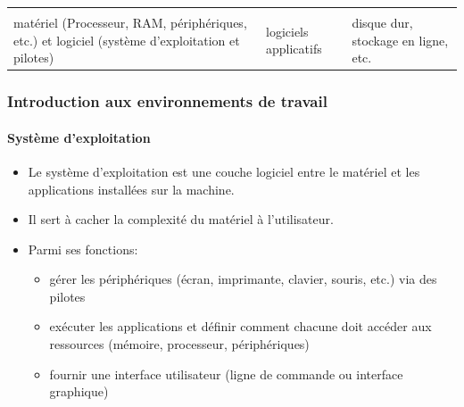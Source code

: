 \documentclass[xcolor=table]{beamer}
\begin{document}
\begin{frame}
\begin{center}
\begin{tabular}{p{}p{}p{}}
	&&\\
	
	matériel (Processeur, RAM, périphériques, etc.) et logiciel (système d'exploitation et pilotes) &
	logiciels applicatifs & 
	disque dur, stockage en ligne, etc. \\
	\end{tabular}
\end{center}

\end{frame}

%
%

\begin{frame}
\frametitle{Introduction aux environnements de travail}
\framesubtitle{Système d'exploitation}

\begin{itemize}
\item Le système d'exploitation est une couche logiciel entre le matériel et les applications installées sur la machine.

\item Il sert à cacher la complexité du matériel à l'utilisateur.

\item Parmi ses fonctions: 
\begin{itemize}
	\item gérer les périphériques (écran, imprimante, clavier, souris, etc.) via des pilotes
	\item exécuter les applications et définir comment chacune doit accéder aux ressources (mémoire, processeur, périphériques)
	\item fournir une interface utilisateur (ligne de commande ou interface graphique)
\end{itemize}
\end{itemize}

\end{frame}
\end{document}
